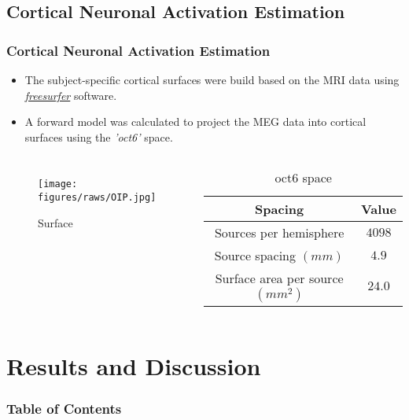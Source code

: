 \documentclass[aspectratio=169]{beamer}
\begin{document}
\subsection{Cortical Neuronal Activation Estimation}
\begin{frame}
    \frametitle{Cortical Neuronal Activation Estimation}

    \begin{itemize}
        \item The subject-specific cortical surfaces were build based on the MRI data using \hyperlink{https://surfer.nmr.mgh.harvard.edu/}{\emph{freesurfer}} software.
        \item A forward model was calculated to project the MEG data into cortical surfaces using the \emph{'oct6'} space.
    \end{itemize}

    \begin{columns}
        \begin{figure}[h]
            \centering
            \texttt{[image: figures/raws/OIP.jpg]}
            \caption{Surface}
        \end{figure}

        \begin{table}
            \caption{oct6 space}
            \begin{tabular}{|c|c|}
                \hline
                \textbf{Spacing}                 & \textbf{Value} \\
                \hline
                \hline
                Sources per hemisphere           & $4098$         \\
                Source spacing $(mm)$            & $4.9$          \\
                Surface area per source $(mm^2)$ & $24.0$         \\
                \hline
            \end{tabular}
        \end{table}

    \end{columns}

\end{frame}

\section{Results and Discussion}
\begin{frame}[plain]
    \frametitle{Table of Contents}
\end{frame}
\end{document}

